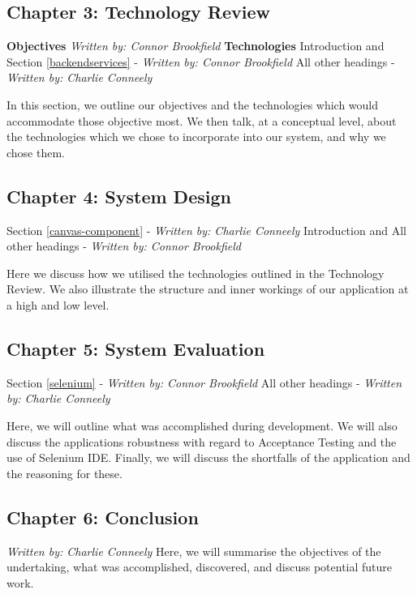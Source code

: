 \subsection{Chapter 3: Technology Review}
\textbf{Objectives} \newline \textit{Written by: Connor Brookfield} \newline
\textbf{Technologies} \newline
Introduction and Section \ref{backendservices} - \textit{Written by: Connor Brookfield} \newline
All other headings - \textit{Written by: Charlie Conneely} 

In this section, we outline our objectives and the technologies which would accommodate those objective most. We then talk, at a conceptual level, about the technologies which we chose to incorporate into our system, and why we chose them. 

\subsection{Chapter 4: System Design}
Section \ref{canvas-component} - \textit{Written by: Charlie Conneely} \newline
Introduction and All other headings - \textit{Written by: Connor Brookfield} 

Here we discuss how we utilised the technologies outlined in the Technology Review. We also illustrate the structure and inner workings of our application at a high and low level.

\subsection{Chapter 5: System Evaluation}
Section \ref{selenium} - \textit{Written by: Connor Brookfield} \newline
All other headings - \textit{Written by: Charlie Conneely} 

Here, we will outline what was accomplished during development. We will also discuss the applications robustness with regard to Acceptance Testing and the use of Selenium IDE. Finally, we will discuss the shortfalls of the application and the reasoning for these.

\subsection{Chapter 6: Conclusion}
\textit{Written by: Charlie Conneely} \newline
Here, we will summarise the objectives of the undertaking, what was accomplished, discovered, and discuss potential future work. 

